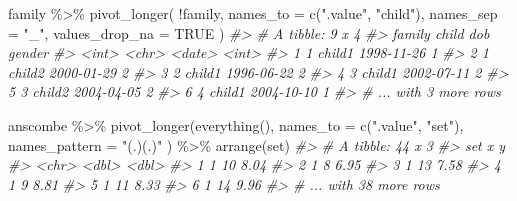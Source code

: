 \documentclass[
]{book}
\newenvironment{Shaded}{\begin{snugshade}}{\end{snugshade}}
\newcommand{\AttributeTok}[1]{\textcolor[rgb]{0.77,0.63,0.00}{#1}}
\newcommand{\CommentTok}[1]{\textcolor[rgb]{0.56,0.35,0.01}{\textit{#1}}}
\newcommand{\ConstantTok}[1]{\textcolor[rgb]{0.00,0.00,0.00}{#1}}
\newcommand{\FunctionTok}[1]{\textcolor[rgb]{0.00,0.00,0.00}{#1}}
\newcommand{\NormalTok}[1]{#1}
\newcommand{\SpecialCharTok}[1]{\textcolor[rgb]{0.00,0.00,0.00}{#1}}
\newcommand{\StringTok}[1]{\textcolor[rgb]{0.31,0.60,0.02}{#1}}
\begin{document}
\begin{Shaded}
\begin{Highlighting}[]

\NormalTok{family }\SpecialCharTok{\%\textgreater{}\%} 
  \FunctionTok{pivot\_longer}\NormalTok{(}
    \SpecialCharTok{!}\NormalTok{family, }
    \AttributeTok{names\_to =} \FunctionTok{c}\NormalTok{(}\StringTok{".value"}\NormalTok{, }\StringTok{"child"}\NormalTok{), }
    \AttributeTok{names\_sep =} \StringTok{"\_"}\NormalTok{, }
    \AttributeTok{values\_drop\_na =} \ConstantTok{TRUE}
\NormalTok{  )}
\CommentTok{\#\textgreater{} \# A tibble: 9 x 4}
\CommentTok{\#\textgreater{}   family child  dob        gender}
\CommentTok{\#\textgreater{}    \textless{}int\textgreater{} \textless{}chr\textgreater{}  \textless{}date\textgreater{}      \textless{}int\textgreater{}}
\CommentTok{\#\textgreater{} 1      1 child1 1998{-}11{-}26      1}
\CommentTok{\#\textgreater{} 2      1 child2 2000{-}01{-}29      2}
\CommentTok{\#\textgreater{} 3      2 child1 1996{-}06{-}22      2}
\CommentTok{\#\textgreater{} 4      3 child1 2002{-}07{-}11      2}
\CommentTok{\#\textgreater{} 5      3 child2 2004{-}04{-}05      2}
\CommentTok{\#\textgreater{} 6      4 child1 2004{-}10{-}10      1}
\CommentTok{\#\textgreater{} \# ... with 3 more rows}
\end{Highlighting}
\end{Shaded}

\begin{Shaded}
\begin{Highlighting}[]
\NormalTok{anscombe }\SpecialCharTok{\%\textgreater{}\%} 
  \FunctionTok{pivot\_longer}\NormalTok{(}\FunctionTok{everything}\NormalTok{(), }
    \AttributeTok{names\_to =} \FunctionTok{c}\NormalTok{(}\StringTok{".value"}\NormalTok{, }\StringTok{"set"}\NormalTok{), }
    \AttributeTok{names\_pattern =} \StringTok{"(.)(.)"}
\NormalTok{  ) }\SpecialCharTok{\%\textgreater{}\%} 
  \FunctionTok{arrange}\NormalTok{(set)}
\CommentTok{\#\textgreater{} \# A tibble: 44 x 3}
\CommentTok{\#\textgreater{}   set       x     y}
\CommentTok{\#\textgreater{}   \textless{}chr\textgreater{} \textless{}dbl\textgreater{} \textless{}dbl\textgreater{}}
\CommentTok{\#\textgreater{} 1 1        10  8.04}
\CommentTok{\#\textgreater{} 2 1         8  6.95}
\CommentTok{\#\textgreater{} 3 1        13  7.58}
\CommentTok{\#\textgreater{} 4 1         9  8.81}
\CommentTok{\#\textgreater{} 5 1        11  8.33}
\CommentTok{\#\textgreater{} 6 1        14  9.96}
\CommentTok{\#\textgreater{} \# ... with 38 more rows}
\end{Highlighting}
\end{Shaded}
\end{document}
